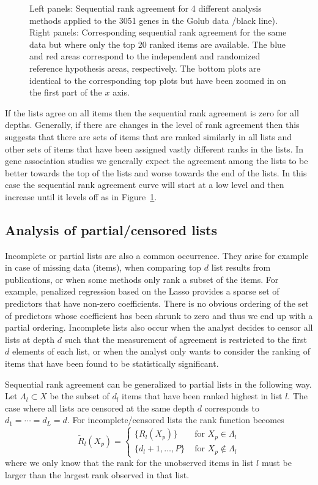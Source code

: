 \documentclass[12pt,a4paper]{article}
\theoremstyle{plain}
\begin{document}
\begin{figure}[htbp]
\begin{center}
 \end{center}
 \caption{Left panels: Sequential rank agreement for 4 different
   analysis methods applied to the 3051 genes in the Golub data /black
   line). Right
   panels: Corresponding sequential rank agreement for the same data
   but where only the top 20 ranked items are available. The blue and
   red areas correspond to the independent and randomized reference
   hypothesis areas, respectively. The bottom plots are identical to
   the corresponding top plots but have been zoomed in on the first
   part of the $x$ axis.}
 \label{fig:example1}
 \end{figure}

 If the lists agree on all items then the sequential rank agreement is
 zero for all depths. Generally, if there are changes in the level of
 rank agreement then this suggests that there are sets of items that
 are ranked similarly in all lists and other sets of items that have
 been assigned vastly different ranks in the lists. In gene
 association studies we generally expect the agreement among the lists
 to be better towards the top of the lists and worse towards the end
 of the lists. In this case the sequential rank agreement curve will
 start at a low level and then increase until it levels off as in
 Figure~\ref{fig:example1}.

\subsection{Analysis of partial/censored lists}

Incomplete or partial lists are also a common occurrence. They arise
for example in case of missing data (items), when comparing top $d$
list results from publications, or when some methods only rank a
subset of the items. For example, penalized regression based on the
Lasso provides a sparse set of predictors that have non-zero
coefficients. There is no obvious ordering of the set of predictors
whose coefficient has been shrunk to zero and thus we end up with a
partial ordering. Incomplete lists also occur when the analyst decides
to censor all lists at depth $d$ such that the measurement of
agreement is restricted to the first $d$ elements of each list, or
when the analyst only wants to consider the ranking of items that have
been found to be statistically significant.

Sequential rank agreement can be generalized to partial lists in the
following way. Let $\Lambda_l\subset X$ be the subset of $d_l$ items
that have been ranked highest in list $l$.  The case where all lists are
censored at the same depth $d$ corresponds to $d_1=\cdots=d_L=d$. For
incomplete/censored lists the rank function becomes
\begin{equation}
  \widetilde R_l(X_p) = \left\{\begin{array}{cl} \{R_l(X_p)\} & \text{ for } X_p\in \Lambda_l \\
      \{d_l+1,\dots,P\} & \text{ for } X_p \not\in \Lambda_l\end{array}\right.
\end{equation}
where we only know that the rank for the unobserved items in list $l$
must be larger than the largest rank observed in that list.
\end{document}

